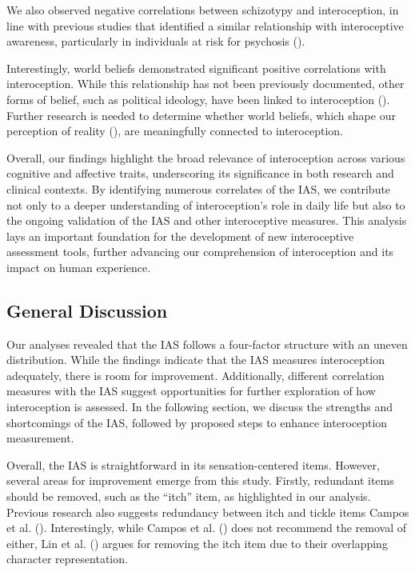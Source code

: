 \documentclass[
  man,
  floatsintext,
  longtable,
  nolmodern,
  notxfonts,
  notimes,
  colorlinks=true,linkcolor=blue,citecolor=blue,urlcolor=blue]{apa7}
\begin{document}
We also observed negative correlations between schizotypy and
interoception, in line with previous studies that identified a similar
relationship with interoceptive awareness, particularly in individuals
at risk for psychosis ().

Interestingly, world beliefs demonstrated significant positive
correlations with interoception. While this relationship has not been
previously documented, other forms of belief, such as political
ideology, have been linked to interoception
(). Further research is
needed to determine whether world beliefs, which shape our perception of
reality (), are
meaningfully connected to interoception.

Overall, our findings highlight the broad relevance of interoception
across various cognitive and affective traits, underscoring its
significance in both research and clinical contexts. By identifying
numerous correlates of the IAS, we contribute not only to a deeper
understanding of interoception's role in daily life but also to the
ongoing validation of the IAS and other interoceptive measures. This
analysis lays an important foundation for the development of new
interoceptive assessment tools, further advancing our comprehension of
interoception and its impact on human experience.

\subsection{General Discussion}\label{general-discussion}

Our analyses revealed that the IAS follows a four-factor structure with
an uneven distribution. While the findings indicate that the IAS
measures interoception adequately, there is room for improvement.
Additionally, different correlation measures with the IAS suggest
opportunities for further exploration of how interoception is assessed.
In the following section, we discuss the strengths and shortcomings of
the IAS, followed by proposed steps to enhance interoception
measurement.

Overall, the IAS is straightforward in its sensation-centered items.
However, several areas for improvement emerge from this study. Firstly,
redundant items should be removed, such as the ``itch'' item, as
highlighted in our analysis. Previous research also suggests redundancy
between itch and tickle items Campos et al.
(). Interestingly, while Campos et al.
() does not recommend the removal of
either, Lin et al. () argues for removing
the itch item due to their overlapping character representation.
\end{document}
